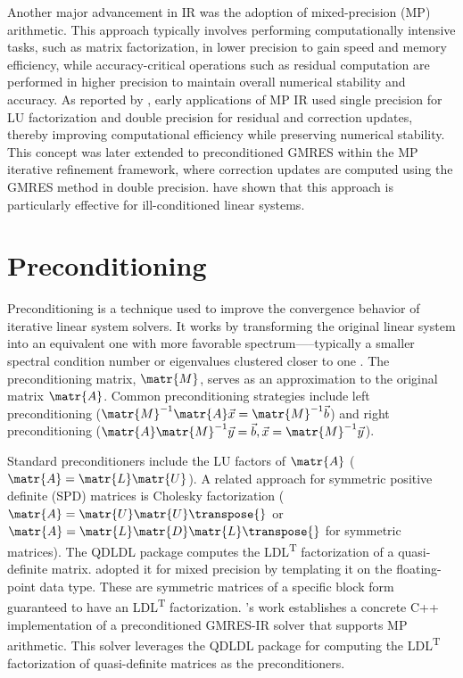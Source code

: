 Another major advancement in IR was the adoption of mixed-precision (MP)
arithmetic. This approach typically involves performing computationally
intensive tasks, such as matrix factorization, in lower precision to gain speed
and memory efficiency, while accuracy-critical operations such as residual
computation are performed in higher precision to maintain overall numerical
stability and accuracy. As reported by \textcite{wong_exploring_2024}, early
applications of MP IR used single precision for LU factorization and double
precision for residual and correction updates, thereby improving computational
efficiency while preserving numerical stability. This concept was later extended
to preconditioned GMRES within the MP iterative refinement framework, where
correction updates are computed using the GMRES method in double precision.
\textcite{lindquist_improving_2020} have shown that this approach is
particularly effective for ill-conditioned linear systems.

\section{Preconditioning}
\label{sec:preconditioning}

Preconditioning is a technique used to improve the convergence behavior of
iterative linear system solvers. It works by transforming the original linear
system into an equivalent one with more favorable spectrum—--typically a smaller
spectral condition number or eigenvalues clustered closer to one
\cite[p.~187]{ascher_first_2011}. The preconditioning matrix, \(\matr{M}\),
serves as an approximation to the original matrix \(\matr{A}\). Common
preconditioning strategies include left preconditioning (\(\matr{M}^{-1}
\matr{A} \vec{x} = \matr{M}^{-1} \vec{b}\)) and right preconditioning
(\(\matr{A} \matr{M}^{-1} \vec{y} = \vec{b}, \vec{x} = \matr{M}^{-1} \vec{y}\)).

Standard preconditioners include the LU factors of \(\matr{A}\) (\(\matr{A} =
\matr{L} \matr{U}\)). A related approach for symmetric positive definite (SPD)
matrices is Cholesky factorization (\(\matr{A} = \matr{U} \matr{U}\transpose{}\)
or \(\matr{A} = \matr{L} \matr{D} \matr{L}\transpose{}\) for symmetric
matrices). The QDLDL package \cite{stellato_osqp_2020} computes the
LDL\textsuperscript{T} factorization of a quasi-definite matrix.
\textcite{shahrooz_derakhshan_using_2023} adopted it for mixed precision by
templating it on the floating-point data type. These are symmetric matrices of a
specific block form guaranteed to have an LDL\textsuperscript{T} factorization.
\textcite{wong_exploring_2024}'s work establishes a concrete C++ implementation
of a preconditioned GMRES-IR solver that supports MP arithmetic. This solver
leverages the QDLDL package for computing the LDL\textsuperscript{T}
factorization of quasi-definite matrices as the preconditioners.


